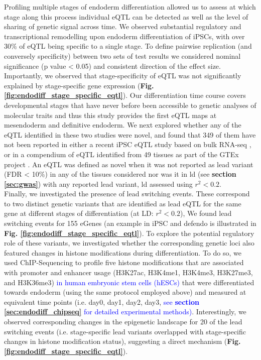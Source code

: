 Profiling multiple stages of endoderm differentiation allowed us to assess at which stage along this process individual eQTL can be detected as well as the level of sharing of genetic signal across time. 
We observed substantial regulatory and transcriptional remodelling upon endoderm differentiation of iPSCs, with over 30\% of eQTL being specific to a single stage.
To define pairwise replication (and conversely specificity) between two sets of test results we considered nominal significance (p value < 0.05) and consistent direction of the effect size.
Importantly, we observed that stage-specificity of eQTL was not significantly explained by stage-specific gene expression (\textbf{Fig. \ref{fig:endodiff_stage_specific_eqtl}}).
Our differentiation time course covers developmental stages that have never before been accessible to genetic analyses of molecular traits and thus this study provides the first eQTL maps at mesendoderm and definitive endoderm.
We next explored whether any of the eQTL identified in these two studies were novel, and found that 349 of them have not been reported in either a recent iPSC eQTL study based on bulk RNA-seq \cite{mirauta2018population}, or in a compendium of eQTL identified from 49 tissues as part of the GTEx project \cite{gtex2017genetic}.
An eQTL was defined as novel when it was not reported as lead variant (FDR < 10\%) in any of the tissues considered nor was it in \gls{ld} (see \textbf{section \ref{sec:gwas}}) with any reported lead variant, \gls{ld} assessed using $r^2<0.2$.\\

Finally, we investigated the presence of lead switching events.
These correspond to two distinct genetic variants that are identified as lead eQTL for the same gene at different stages of differentiation (at LD: $r^2<0.2$),
We found lead switching events for 155 eGenes (an example in iPSC and defendo is illustrated in \textbf{Fig. \ref{fig:endodiff_stage_specific_eqtl}}). 
To explore the potential regulatory role of these variants, we investigated whether the corresponding genetic loci also featured changes in histone modifications during differentiation. 
To do so, we used ChIP-Sequencing to profile five histone modifications that are associated with promoter and enhancer usage (H3K27ac, H3K4me1, H3K4me3, H3K27me3, and H3K36me3) \textcolor{blue}{in human embryonic stem cells (hESCs)} that were differentiated towards endoderm (using the same protocol employed above) and measured at equivalent time points (i.e. day0, day1, day2, day3, \textcolor{blue}{see \textbf{section \ref{sec:endodiff_chipseq}} for detailed experimental methods)}. 
Interestingly, we observed corresponding changes in the epigenetic landscape for 20 of the lead switching events (i.e. stage-specific lead variants overlapped with stage-specific changes in histone modification status), suggesting a direct mechanism (\textbf{Fig. \ref{fig:endodiff_stage_specific_eqtl}}).

